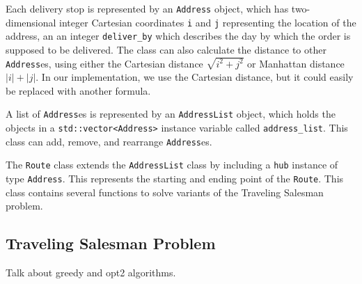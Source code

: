 \documentclass[letterpaper]{article}
\begin{document}
    Each delivery stop is represented by an \verb|Address| object, which has two-dimensional integer Cartesian coordinates \verb|i| and \verb|j| representing the location of the address, an an integer \verb|deliver_by| which describes the day by which the order is supposed to be delivered. The class can also calculate the distance to other \verb|Address|es, using either the Cartesian distance $\sqrt{i^{2} + j^{2}}$ or Manhattan distance $|i| + |j|$. In our implementation, we use the Cartesian distance, but it could easily be replaced with another formula.

    A list of \verb|Address|es is represented by an \verb|AddressList| object, which holds the objects in a \verb|std::vector<Address>| instance variable called \verb|address_list|. This class can add, remove, and rearrange \verb|Address|es.

    The \verb|Route| class extends the \verb|AddressList| class by including a \verb|hub| instance of type \verb|Address|. This represents the starting and ending point of the \verb|Route|. This class contains several functions to solve variants of the Traveling Salesman problem.

    \subsection{Traveling Salesman Problem}
    \label{subsection:Traveling_Salesman_Problem}

    Talk about greedy and opt2 algorithms.
\end{document}
